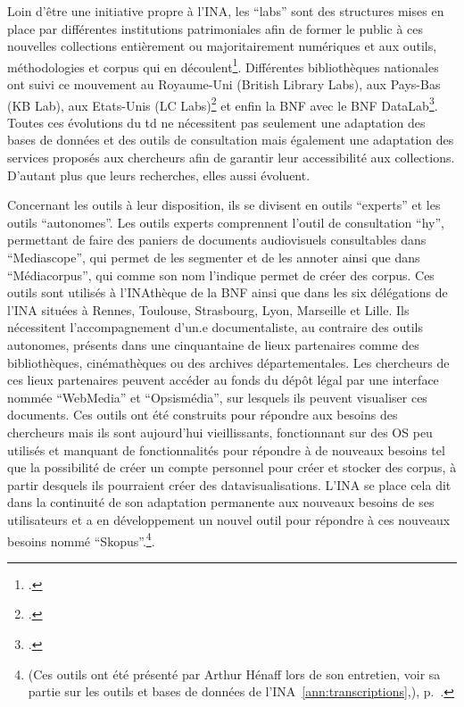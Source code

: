Loin d'être une initiative propre à l'INA, les \enquote{labs} sont des structures mises en place par différentes institutions patrimoniales afin de former le public à ces nouvelles collections entièrement ou majoritairement numériques et aux outils, méthodologies et corpus qui en découlent\footcite[][196]{bermès2024}. Différentes bibliothèques nationales ont suivi ce mouvement au Royaume-Uni (British Library Labs), aux Pays-Bas (KB Lab), aux Etats-Unis (LC Labs)\footcite[197]{bermès2024} et enfin la BNF avec le BNF DataLab\footcite[][199]{bermès2024}. Toutes ces évolutions du \gls{td} ne nécessitent pas seulement une adaptation des bases de données et des outils de consultation mais également une adaptation des services proposés aux chercheurs afin de garantir leur accessibilité aux collections. D'autant plus que leurs recherches, elles aussi évoluent.


Concernant les outils à leur disposition, ils se divisent en outils \enquote{experts} et les outils \enquote{autonomes}. Les outils experts comprennent l'outil de consultation \enquote{\gls{hy}}, permettant de faire des paniers de documents audiovisuels consultables dans \enquote{Mediascope}, qui permet de les segmenter et de les annoter ainsi que dans \enquote{Médiacorpus}, qui comme son nom l'indique permet de créer des corpus. Ces outils sont utilisés à l'INAthèque de la BNF ainsi que dans les six délégations de l'INA situées à Rennes, Toulouse, Strasbourg, Lyon, Marseille et Lille. Ils nécessitent l'accompagnement d'un.e documentaliste, au contraire des outils autonomes, présents dans une cinquantaine de lieux partenaires comme des bibliothèques, cinémathèques ou des archives départementales. Les chercheurs de ces lieux partenaires peuvent accéder au fonds du dépôt légal par une interface nommée \enquote{WebMedia} et \enquote{Opsismédia}, sur lesquels ils peuvent visualiser ces documents. Ces outils ont été construits pour répondre aux besoins des chercheurs mais ils sont aujourd'hui vieillissants, fonctionnant sur des OS peu utilisés et manquant de fonctionnalités pour répondre à de nouveaux besoins tel que la possibilité de créer un compte personnel pour créer et stocker des corpus, à partir desquels ils pourraient créer des datavisualisations. L'INA se place cela dit dans la continuité de son adaptation permanente aux nouveaux besoins de ses utilisateurs et a en développement un nouvel outil pour répondre à ces nouveaux besoins nommé \enquote{Skopus}.\footnote{(Ces outils ont été présenté par Arthur Hénaff lors de son entretien, voir sa partie sur les outils et bases de données de l'INA~\ref{ann:transcriptions},), p.~\pageref{ann:transcriptions}.}. 

